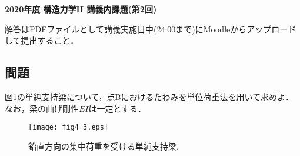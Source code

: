 \documentclass[10pt,a4j]{jarticle}
\newlength{\minitwocolumn}
\begin{document}
\newcommand{\fat}[1]{\mbox{\boldmath $#1$}}
\newcommand{\D}{\partial}
\newcommand{\w}{\omega}
\newcommand{\ga}{\alpha}
\newcommand{\gb}{\beta}
\newcommand{\gx}{\xi}
\newcommand{\gz}{\zeta}
\newcommand{\vhat}[1]{\hat{\fat{#1}}}
\newcommand{\spc}{\vspace{0.7\baselineskip}}
\newcommand{\halfspc}{\vspace{0.3\baselineskip}}

\newcommand{\twofig}[2]
 {
   \begin{figure}
     \begin{minipage}[t]{\minitwocolumn}
         \begin{center}   #1
         \end{center}
     \end{minipage}
         \hspace{\columnsep}
     \begin{minipage}[t]{\minitwocolumn}
         \begin{center} #2
         \end{center}
     \end{minipage}
   \end{figure}
 }
\begin{center}
	{\Large \bf 2020年度 構造力学II 講義内課題(第2回)} \\
\end{center}
\vspace{10mm}
解答はPDFファイルとして講義実施日中(24:00まで)にMoodleからアップロードして提出すること．
\subsection*{問題}
図\ref{fig:fig4_3}の単純支持梁について，点Bにおけるたわみを単位荷重法を用いて求めよ．
なお，梁の曲げ剛性$EI$は一定とする．
\begin{figure}[h]
	\begin{center}
	\texttt{[image: fig4\_3.eps]} 
	\end{center}
	\caption{鉛直方向の集中荷重を受ける単純支持梁.} 
	\label{fig:fig4_3}
\end{figure}
\end{document}
